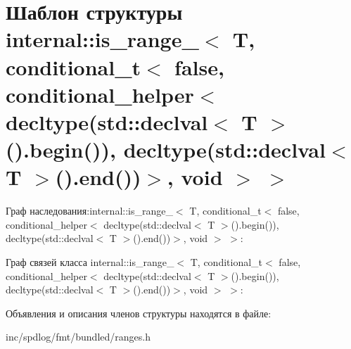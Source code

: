 \hypertarget{structinternal_1_1is__range___3_01T_00_01conditional__t_3_01false_00_01conditional__helper_3_01ddcdd363b04da56ec70280bf106515bbc}{}\section{Шаблон структуры internal\+:\+:is\+\_\+range\+\_\+$<$ T, conditional\+\_\+t$<$ false, conditional\+\_\+helper$<$ decltype(std\+:\+:declval$<$ T $>$().begin()), decltype(std\+:\+:declval$<$ T $>$().end())$>$, void $>$ $>$}
\label{structinternal_1_1is__range___3_01T_00_01conditional__t_3_01false_00_01conditional__helper_3_01ddcdd363b04da56ec70280bf106515bbc}


Граф наследования\+:internal\+:\+:is\+\_\+range\+\_\+$<$ T, conditional\+\_\+t$<$ false, conditional\+\_\+helper$<$ decltype(std\+:\+:declval$<$ T $>$().begin()), decltype(std\+:\+:declval$<$ T $>$().end())$>$, void $>$ $>$\+:


Граф связей класса internal\+:\+:is\+\_\+range\+\_\+$<$ T, conditional\+\_\+t$<$ false, conditional\+\_\+helper$<$ decltype(std\+:\+:declval$<$ T $>$().begin()), decltype(std\+:\+:declval$<$ T $>$().end())$>$, void $>$ $>$\+:


Объявления и описания членов структуры находятся в файле\+:\begin{DoxyCompactItemize}
\item 
inc/spdlog/fmt/bundled/ranges.\+h\end{DoxyCompactItemize}
